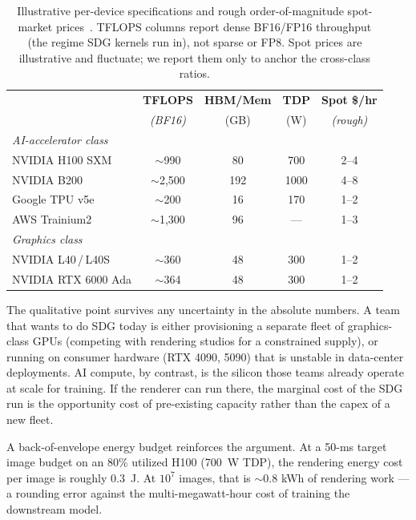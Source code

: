 \documentclass[10pt,journal]{IEEEtran}
\begin{document}
\begin{table}[t]
\centering
\caption{Illustrative per-device specifications and rough order-of-magnitude
spot-market prices~\cite{nvidia-hopper-h100,nvidia-blackwell-b200,nvidia-l40,google-tpu-v5}.
TFLOPS columns report dense BF16\slash FP16 throughput (the regime SDG
kernels run in), not sparse or FP8. Spot prices are illustrative and
fluctuate; we report them only to anchor the cross-class ratios.}
\label{tab:hardware}
\small
\begin{tabular}{@{}lcccc@{}}
\toprule
& \textbf{TFLOPS} & \textbf{HBM/Mem} & \textbf{TDP} & \textbf{Spot \$/hr} \\
& \textit{(BF16)} & (GB) & (W) & \textit{(rough)} \\
\midrule
\textit{AI-accelerator class} & & & & \\
NVIDIA H100 SXM   &  $\sim$990  & 80   & 700  & 2--4  \\
NVIDIA B200       & $\sim$2{,}500 & 192 & 1000 & 4--8  \\
Google TPU v5e    &  $\sim$200  & 16   & 170  & 1--2  \\
AWS Trainium2     &  $\sim$1{,}300 & 96 & ---  & 1--3  \\
\midrule
\textit{Graphics class}       & & & & \\
NVIDIA L40\,/\,L40S         &  $\sim$360  & 48   & 300  & 1--2 \\
NVIDIA RTX 6000 Ada         &  $\sim$364  & 48   & 300  & 1--2 \\
\bottomrule
\end{tabular}
\end{table}

The qualitative point survives any uncertainty in the absolute numbers.
A team that wants to do SDG today is either provisioning a separate
fleet of graphics-class GPUs (competing with rendering studios for a
constrained supply), or running on consumer hardware (RTX 4090, 5090)
that is unstable in data-center deployments. AI compute, by contrast,
is the silicon those teams already operate at scale for training. If
the renderer can run there, the marginal cost of the SDG run is the
opportunity cost of pre-existing capacity rather than the capex of a
new fleet.

A back-of-envelope energy budget reinforces the argument. At a 50-ms
target image budget on an 80\% utilized H100 (700~W TDP), the
rendering energy cost per image is roughly $0.3$~J. At
$10^7$ images, that is $\sim 0.8$ kWh of rendering work --- a
rounding error against the multi-megawatt-hour cost of training the
downstream model.
\end{document}
